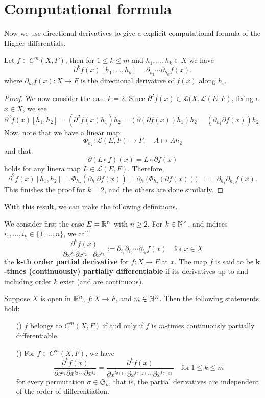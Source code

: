 \section{Computational formula}
Now we use directional derivatives to give a explicit computational formula of the Higher differentials.
\begin{proposition}
Let $f\in C^m(X,F)$, then for $1\leq k\leq m$ and $h_1,\dots,h_k\in X$ we have
\[\partial^kf(x)[h_1,\dots,h_k]=\partial_{h_1}\cdots\partial_{h_k}f(x).\]
where $\partial_{h_i}f(x):X\to F$ is the directional derivative of $f(x)$ along $h_i$.
\end{proposition}
\begin{proof}
We now consider the case $k=2$. Since $\partial^2f(x)\in\mathcal{L}(X,\mathcal{L}(E,F)$, fixing a $x\in X$, we see
\[\partial^2f(x)[h_1,h_2]=(\partial^2f(x)h_1)h_2=(\partial(\partial f(x))h_1)h_2=(\partial_{h_1}\partial f(x))h_2.\]
Now, note that we have a linear map 
\[\varPhi_{h_2}:\mathcal{L}(E,F)\to F,\quad A\mapsto Ah_2\]
and that
\[\partial(L\circ f)(x)=L\circ\partial f(x)\]
holds for any linera map $L\in\mathcal{L}(E,F)$. Therefore,
\[\partial^2f(x)[h_1,h_2]=\varPhi_{h_2}(\partial_{h_1}\partial f(x))=\partial_{h_1}\big(\varPhi_{h_2}(\partial f(x))\big)==\partial_{h_1}\partial_{h_2}f(x).\]
This finishes the proof for $k=2$, and the others are done similarly.
\end{proof}
With this result, we can make the following definitions.
\begin{definition}
We consider first the case $E=\mathbb{R}^n$ with $n\geq 2$.
For $k\in\mathbb{N}^{\times}$, and indices $i_1,\dots,i_k\in\{1,\dots,n\}$, we call
\[\dfrac{\partial^k f(x)}{\partial x^{i_1}\partial x^{i_2}\cdots\partial x^{i_k}}:=\partial_{i_1}\partial_{i_2}\cdots\partial_{i_k} f(x)\quad \text{for}\ x\in X\]
the \textbf{$\bm{k}$-th order partial derivative} for $f:X\to F$ at $x$. The map $f$ is said to be \textbf{$\bm{k}$-times (continuously) partially differentiable} if its derivatives up to and including
order $k$ exist (and are continuous).
\end{definition}
\begin{theorem}
Suppose $X$ is open in $\mathbb{R}^n$, $f:X\to F$, and $m\in \mathbb{N}^{\times}$. Then the
following statements hold:
\begin{itemize}
\item[(\rmnum{1})]$f$ belongs to $C^m(X,F)$ if and only if $f$ is $m$-times continuously partially differentiable.
\item[(\rmnum{2})]For $f \in C^m(X,F)$, we have
\[\dfrac{\partial^k f(x)}{\partial x^{i_1}\partial x^{i_2}\cdots\partial x^{i_k}}=\dfrac{\partial^k f(x)}{\partial x^{i_{\sigma(1)}}\partial x^{i_{\sigma(2)}}\cdots\partial x^{i_{\sigma(k)}}}\quad\text{for}\ 1\leq k\leq m\]
for every permutation $\sigma\in\mathfrak{S}_k$, that is, the partial derivatives are independent of the order of differentiation.
\end{itemize}
\end{theorem}
